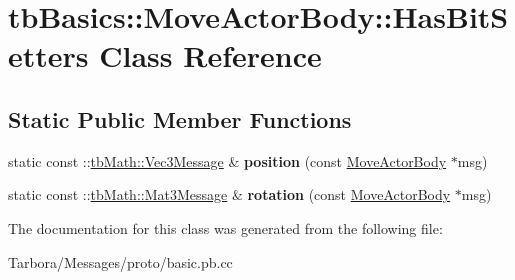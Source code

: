 \hypertarget{classtbBasics_1_1MoveActorBody_1_1HasBitSetters}{}\section{tb\+Basics\+:\+:Move\+Actor\+Body\+:\+:Has\+Bit\+Setters Class Reference}
\label{classtbBasics_1_1MoveActorBody_1_1HasBitSetters}
\subsection*{Static Public Member Functions}
\begin{DoxyCompactItemize}
\item 
\mbox{\label{classtbBasics_1_1MoveActorBody_1_1HasBitSetters_a9fb7eb171f0e51279faad39bea028c8c}} 
static const \+::\hyperlink{classtbMath_1_1Vec3Message}{tb\+Math\+::\+Vec3\+Message} \& {\bfseries position} (const \hyperlink{classtbBasics_1_1MoveActorBody}{Move\+Actor\+Body} $\ast$msg)
\item 
\mbox{\label{classtbBasics_1_1MoveActorBody_1_1HasBitSetters_a955400dfca292acbfeb0e4dfd0bb46fa}} 
static const \+::\hyperlink{classtbMath_1_1Mat3Message}{tb\+Math\+::\+Mat3\+Message} \& {\bfseries rotation} (const \hyperlink{classtbBasics_1_1MoveActorBody}{Move\+Actor\+Body} $\ast$msg)
\end{DoxyCompactItemize}


The documentation for this class was generated from the following file\+:\begin{DoxyCompactItemize}
\item 
Tarbora/\+Messages/proto/basic.\+pb.\+cc\end{DoxyCompactItemize}
